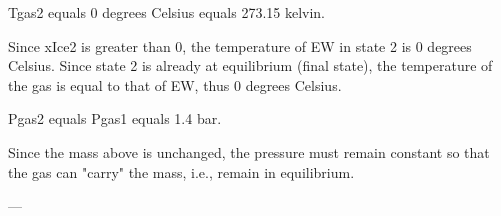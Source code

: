 Tgas2 equals 0 degrees Celsius equals 273.15 kelvin.  

Since xIce2 is greater than 0, the temperature of EW in state 2 is 0 degrees Celsius. Since state 2 is already at equilibrium (final state), the temperature of the gas is equal to that of EW, thus 0 degrees Celsius.  

Pgas2 equals Pgas1 equals 1.4 bar.  

Since the mass above is unchanged, the pressure must remain constant so that the gas can "carry" the mass, i.e., remain in equilibrium.  

---